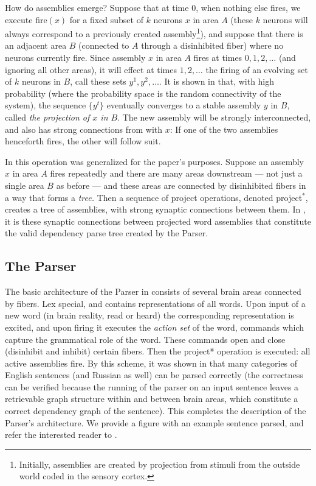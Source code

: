 \documentclass[11pt]{article}
\begin{document}
How do assemblies emerge?  Suppose that at time $0$, when nothing else fires, we execute fire$(x)$ for a fixed subset of $k$ neurons $x$ in area $A$ (these $k$ neurons will always correspond to a previously created assembly\footnote{Initially, assemblies are created by projection from stimuli from the outside world coded in the sensory cortex.}), and suppose that there is an adjacent area $B$ (connected to $A$ through a disinhibited fiber) where no neurons currently fire.  Since assembly $x$ in area $A$ fires at times $0,1,2,\ldots$ (and ignoring all other areas), it will effect at times $1,2,\ldots$ the firing of an evolving set of $k$ neurons in $B$, call these sets $y^{1},y^{2},\ldots$.  It is shown in \citet{PNAS} that, with high probability (where the probability space is the random connectivity of the system), the sequence $\{y^t\}$  eventually converges to a stable assembly $y$ in $B$, called {\em the projection of $x$ in $B$}. The new assembly will be strongly interconnected, and also has strong connections from with $x$: If one of the two assemblies henceforth fires, the other will follow suit.


In \citet{Parser} this operation was generalized for the paper's purposes. Suppose an assembly $x$ in area $A$ fires repeatedly and there are many areas downstream --- not just a single area $B$ as before --- and these areas are connected by disinhibited fibers in a way that forms a {\em tree.}  Then a sequence of project operations, denoted project$^*$, creates a tree of assemblies, with strong synaptic connections between them.
In \cite{Parser}, it is these synaptic connections between projected word assemblies that constitute the valid dependency parse tree created by the Parser.

\subsection{The Parser}
The basic architecture of the Parser in \citet{Parser} consists of several brain areas connected by fibers. {\sc Lex} special, and contains representations of all words. Upon input of a new word (in brain reality, read or heard) the corresponding representation is excited, and upon firing it executes the {\em action set} of the word, commands which capture the grammatical role of the word.  These commands open and close (disinhibit and inhibit) certain fibers. Then the project* operation is executed: all active assemblies fire.  By this scheme, it was shown in \citet{Parser} that many categories of English sentences (and Russian as well) can be parsed correctly (the correctness can be verified because the running of the parser on an input sentence leaves a retrievable graph structure within and between brain areas, which constitute a correct dependency graph of the sentence).
This completes the description of the Parser's architecture.  We provide a figure with an example sentence parsed, and refer the interested reader to \citet{Parser}.
\end{document}
